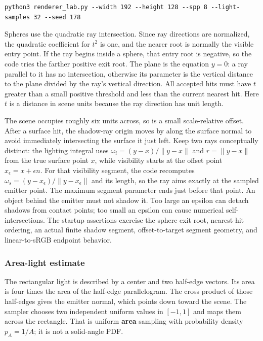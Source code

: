 \begin{verbatim}
python3 renderer_lab.py --width 192 --height 128 --spp 8 --light-samples 32 --seed 178
\end{verbatim}

Spheres use the quadratic ray intersection. Since ray directions are normalized, the quadratic coefficient for \(t^2\) is one, and the nearer root is normally the visible entry point. If the ray begins inside a sphere, that entry root is negative, so the code tries the farther positive exit root. The plane is the equation \(y=0\): a ray parallel to it has no intersection, otherwise its parameter is the vertical distance to the plane divided by the ray's vertical direction. All accepted hits must have \(t\) greater than a small positive threshold and less than the current nearest hit. Here \(t\) is a distance in scene units because the ray direction has unit length.

The scene occupies roughly six units across, so  is a small scale-relative offset. After a surface hit, the shadow-ray origin moves by  along the surface normal to avoid immediately intersecting the surface it just left. Keep two rays conceptually distinct: the lighting integral uses \(\omega_i=(y-x)/\|y-x\|\) and \(r=\|y-x\|\) from the true surface point \(x\), while visibility starts at the offset point \(x_\epsilon=x+\epsilon n\). For that visibility segment, the code recomputes \(\omega_s=(y-x_\epsilon)/\|y-x_\epsilon\|\) and its length, so the ray aims exactly at the sampled emitter point. The maximum segment parameter ends just before that point. An object behind the emitter must not shadow it. Too large an epsilon can detach shadows from contact points; too small an epsilon can cause numerical self-intersections. The startup assertions exercise the sphere exit root, nearest-hit ordering, an actual finite shadow segment, offset-to-target segment geometry, and linear-to-sRGB endpoint behavior.

\subsubsection{Area-light estimate}\label{04-visual-computing-ii-ch035-area-light-estimate}

\hypertarget{04-visual-computing-ii-ch035-area-light-estimate}{}

The rectangular light is described by a center and two half-edge vectors. Its area is four times the area of the half-edge parallelogram. The cross product of those half-edges gives the emitter normal, which points down toward the scene. The sampler chooses two independent uniform values in \([-1,1]\) and maps them across the rectangle. That is uniform \textbf{area} sampling with probability density \(p_A=1/A\); it is not a solid-angle PDF.

